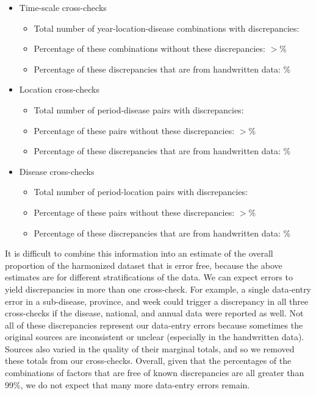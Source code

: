 \documentclass[12pt]{article}
\begin{document}
\begin{itemize}
  \item Time-scale cross-checks
  \begin{itemize}
    \item Total number of year-location-disease combinations with discrepancies: 
    \item Percentage of these combinations without these discrepancies: $>$\%
    \item Percentage of these discrepancies that are from handwritten data: \%
  \end{itemize}
  \item Location cross-checks
  \begin{itemize}
    \item Total number of period-disease pairs with discrepancies: 
    \item Percentage of these pairs without these discrepancies: $>$\%
    \item Percentage of these discrepancies that are from handwritten data: \%
  \end{itemize}
  \item Disease cross-checks
  \begin{itemize}
    \item Total number of period-location pairs with discrepancies: 
    \item Percentage of these pairs without these discrepancies: $>$\%
    \item Percentage of these discrepancies that are from handwritten data: \%
  \end{itemize}
\end{itemize}
It is difficult to combine this information into an estimate of the overall proportion of the harmonized dataset that is error free, because the above estimates are for different stratifications of the data. We can expect errors to yield discrepancies in more than one cross-check. For example, a single data-entry error in a sub-disease, province, and week could trigger a discrepancy in all three cross-checks if the disease, national, and annual data were reported as well. Not all of these discrepancies represent our data-entry errors because sometimes the original sources are inconsistent or unclear (especially in the handwritten data). Sources also varied in the quality of their marginal totals, and so we removed these totals from our cross-checks. Overall, given that the percentages of the combinations of factors that are free of known discrepancies are all greater than 99\%, we do not expect that many more data-entry errors remain.
\end{document}

